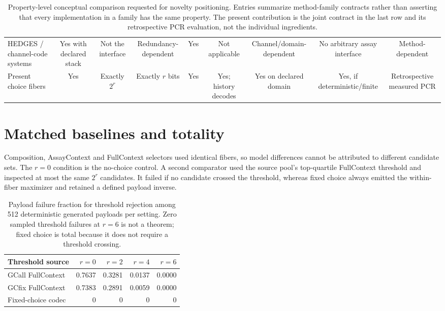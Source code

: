 \documentclass[10pt]{article}
\begin{document}
\begin{table}[H]
{\begin{tabular}{lcccccccc}
HEDGES / channel-code systems & Yes with declared stack & Not the interface & Redundancy-dependent & Yes & Not applicable & Channel/domain-dependent & No arbitrary assay interface & Method-dependent\\
Present choice fibers & Yes & Exactly $2^r$ & Exactly $r$ bits & Yes & Yes; history decodes & Yes on declared domain & Yes, if deterministic/finite & Retrospective measured PCR\\
\bottomrule
\end{tabular}}
\caption{Property-level conceptual comparison requested for novelty positioning. Entries summarize method-family contracts rather than asserting that every implementation in a family has the same property. The present contribution is the joint contract in the last row and its retrospective PCR evaluation, not the individual ingredients.}
\label{tab:s-property-matrix}
\end{table}

\section{Matched baselines and totality}

Composition, AssayContext and FullContext selectors used identical fibers, so model differences cannot be attributed to different candidate sets. The $r=0$ condition is the no-choice control. A second comparator used the source pool's top-quartile FullContext threshold and inspected at most the same $2^r$ candidates. It failed if no candidate crossed the threshold, whereas fixed choice always emitted the within-fiber maximizer and retained a defined payload inverse.

\begin{table}[H]
\centering
\small
\begin{tabular}{lrrrr}
\toprule
Threshold source & $r=0$ & $r=2$ & $r=4$ & $r=6$ \\
\midrule
GCall FullContext & 0.7637 & 0.3281 & 0.0137 & 0.0000 \\
GCfix FullContext & 0.7383 & 0.2891 & 0.0059 & 0.0000 \\
Fixed-choice codec & 0 & 0 & 0 & 0 \\
\bottomrule
\end{tabular}
\caption{Payload failure fraction for threshold rejection among 512 deterministic generated payloads per setting. Zero sampled threshold failures at $r=6$ is not a theorem; fixed choice is total because it does not require a threshold crossing.}
\label{tab:s-threshold}
\end{table}
\end{document}
